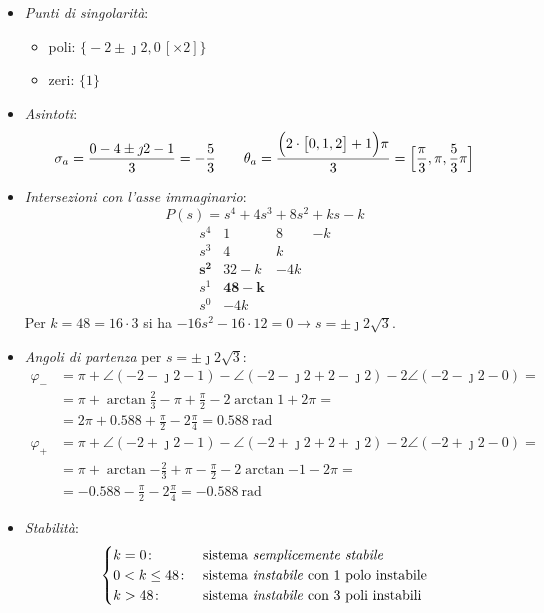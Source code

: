 \begin{itemize}
	\item \emph{Punti di singolarità}:
		\begin{itemize}
			\item poli: \(\bigl\{ -2\pm\jmath2, 0\,[\times 2] \bigr\}\)
			\item zeri: \(\bigl\{ 1 \bigr\}\)
		\end{itemize}
	\item \emph{Asintoti}:
		\[
			\sigma_a = \frac{0-4\pm\jmath2-1}{3} = -\frac{5}{3} \qquad
			\theta_a = \frac{\Bigl(2\cdot \bigl[ 0,1,2 \bigr] +1 \Bigr)\pi}{3} = \Bigl[ \frac{\pi}{3},\pi,\frac{5}{3}\pi \Bigr]
		\]
	\item \emph{Intersezioni con l'asse immaginario}:
		\[
			P(s) = s^4 +4s^3 +8s^2 +ks -k
		\]
		\[\begin{array}{r|rrr}
			s^4 	 & 1    &   8 & -k \\
			s^3 	 & 4    &   k 	   \\
			\bm{s^2} & 32-k & -4k 	   \\
			s^1 	 & \bm{48-k} 	   \\
			s^0 	 & -4k
		\end{array}\]
		Per \(k = 48 = 16\cdot3\) si ha \(-16s^2-16\cdot12=0 \rightarrow
		s = \pm\jmath2\sqrt{3}\).
	\item \emph{Angoli di partenza} per \(s = \pm\jmath2\sqrt{3}\):
		\begin{align*}
			\varphi_- &= \pi + \angle(-2-\jmath2-1) -\angle(-2-\jmath2+2-\jmath2) -2\angle(-2-\jmath2-0) = \\
				  &= \pi + \arctan{\frac{2}{3}} -\pi +\frac{\pi}{2} -2\arctan{1} +2\pi = \\
				  &= 2\pi +0.588 +\frac{\pi}{2} -2\frac{\pi}{4} = \SI{0.588}{\radian} \\
			\varphi_+ &= \pi +\angle(-2+\jmath2-1) -\angle(-2+\jmath2+2+\jmath2) -2\angle(-2+\jmath2-0) = \\
				  &= \pi +\arctan{-\frac{2}{3}} +\pi -\frac{\pi}{2} -2\arctan{-1} -2\pi = \\
				  &= -0.588 -\frac{\pi}{2} -2\frac{\pi}{4} = \SI{-0.588}{\radian}
		\end{align*}
	\item \emph{Stabilità}:
		\[\begin{cases}
			k = 0\colon & \text{sistema \emph{semplicemente stabile}} \\
			0 < k \leq 48\colon & \text{sistema \emph{instabile} con 1 polo instabile} \\
			k > 48\colon & \text{sistema \emph{instabile} con 3 poli instabili}
		\end{cases}\]
\end{itemize}

